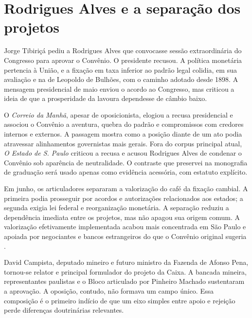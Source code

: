 
\section{Rodrigues Alves e a separação dos projetos}

Jorge Tibiriçá pediu a Rodrigues Alves que convocasse sessão extraordinária do Congresso para aprovar o Convênio. O presidente recusou. A política monetária pertencia à União, e a fixação em taxa inferior ao padrão legal colidia, em sua avaliação e na de Leopoldo de Bulhões, com o caminho adotado desde 1898. A mensagem presidencial de maio enviou o acordo ao Congresso, mas criticou a ideia de que a prosperidade da lavoura dependesse de câmbio baixo.

O \textit{Correio da Manhã}, apesar de oposicionista, elogiou a recusa presidencial e associou o Convênio a aventura, quebra do padrão e compromissos com credores internos e externos. A passagem mostra como a posição diante de um ato podia atravessar alinhamentos governistas mais gerais. Fora do corpus principal atual, \textit{O Estado de S. Paulo} criticou a recusa e acusou Rodrigues Alves de condenar o Convênio sob aparência de neutralidade. O contraste que preservei na monografia de graduação será usado apenas como evidência acessória, com estatuto explícito.


Em junho, os articuladores separaram a valorização do café da fixação cambial. A primeira podia prosseguir por acordos e autorizações relacionados aos estados; a segunda exigia lei federal e reorganização monetária. A separação reduziu a dependência imediata entre os projetos, mas não apagou sua origem comum. A valorização efetivamente implementada acabou mais concentrada em São Paulo e apoiada por negociantes e bancos estrangeiros do que o Convênio original sugeria \cite{holloway1978}.

David Campista, deputado mineiro e futuro ministro da Fazenda de Afonso Pena, tornou-se relator e principal formulador do projeto da Caixa. A bancada mineira, representantes paulistas e o Bloco articulado por Pinheiro Machado sustentaram a aprovação. A oposição, contudo, não formava um campo único. Essa composição é o primeiro indício de que um eixo simples entre apoio e rejeição perde diferenças doutrinárias relevantes.

